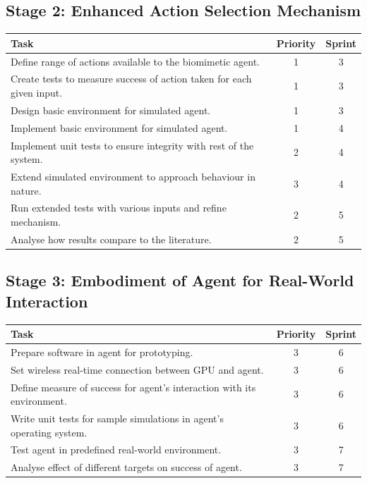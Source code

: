 \documentclass[a4paper,11pt]{article}
\begin{document}
\subsection{Stage 2: Enhanced Action Selection Mechanism}
\begin{center}
    \begin{tabular}{p{12cm} c c}
    \textbf{Task} & \textbf{Priority} & \textbf{Sprint} \\ \hline
	Define range of actions available to the biomimetic agent. & 1 & 3 \\
	Create tests to measure success of action taken for each given input. & 1 & 3 \\ 
	Design basic environment for simulated agent. & 1 & 3 \\
	Implement basic environment for simulated agent. & 1 & 4 \\
	Implement unit tests to ensure integrity with rest of the system. & 2 & 4 \\
	Extend simulated environment to approach behaviour in nature. & 3 & 4 \\
	Run extended tests with various inputs and refine mechanism. & 2 & 5 \\
	Analyse how results compare to the literature. & 2 & 5 \\
    \end{tabular}
\end{center}

\subsection{Stage 3: Embodiment of Agent for Real-World Interaction}
\begin{center}
    \begin{tabular}{p{12cm} c c}
    \textbf{Task} & \textbf{Priority} & \textbf{Sprint} \\ \hline
	Prepare software in agent for prototyping. & 3 & 6 \\
	Set wireless real-time connection between GPU and agent. & 3 & 6 \\
	Define measure of success for agent's interaction with its environment. & 3 & 6 \\
	Write unit tests for sample simulations in agent's operating system. & 3 & 6 \\
	Test agent in predefined real-world environment. & 3 & 7 \\
	Analyse effect of different targets on success of agent. & 3 & 7 \\
    \end{tabular}
\end{center}	
\end{document}
